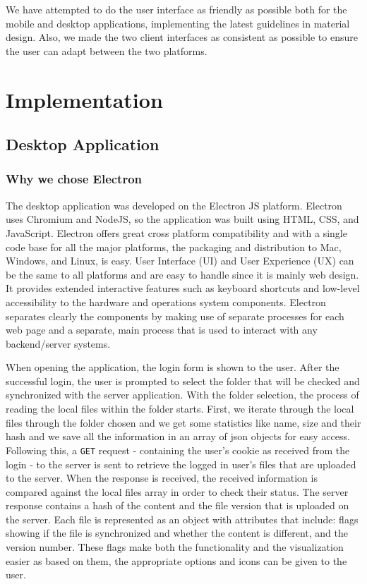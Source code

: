 \documentclass[11pt]{article}
\begin{document}
We have attempted to do the user interface as friendly as possible both for the mobile and desktop applications, implementing the latest guidelines in material design. Also, we made the two client interfaces as consistent as possible to ensure the user can adapt between the two platforms.


\section{Implementation}

\subsection{Desktop Application}

\subsubsection*{Why we chose Electron}

The desktop application was developed on the Electron JS platform. Electron uses Chromium and NodeJS, so the application was built using HTML, CSS, and JavaScript. Electron offers great cross platform compatibility and with a single code base for all the major platforms, the packaging and distribution to Mac, Windows, and Linux, is easy. User Interface (UI) and User Experience (UX) can be the same to all platforms and are easy to handle since it is mainly web design. It provides extended interactive features such as keyboard shortcuts and low-level accessibility to the hardware and operations system components. Electron separates clearly the components by making use of separate processes for each web page and a separate, main process that is used to interact with any backend/server systems.

When opening the application, the login form is shown to the user. After the successful login, the user is prompted to select the folder that will be checked and synchronized with the server application. With the folder selection, the process of reading the local files within the folder starts. First, we iterate through the local files through the folder chosen and we get some statistics like name, size and their hash and we save all the information in an array of json objects for easy access. Following this, a {\tt GET} request - containing the user’s cookie as received from the login - to the server is sent to retrieve the logged in user’s files that are uploaded to the server. When the response is received, the received information is compared against the local files array in order to check their status. The server response contains a hash of the content and the file version that is uploaded on the server. Each file is represented as an object with attributes that include: flags showing if the file is synchronized and whether the content is different, and the version number. These flags make both the functionality and the visualization easier as based on them, the appropriate options and icons can be given to the user.
\end{document}
